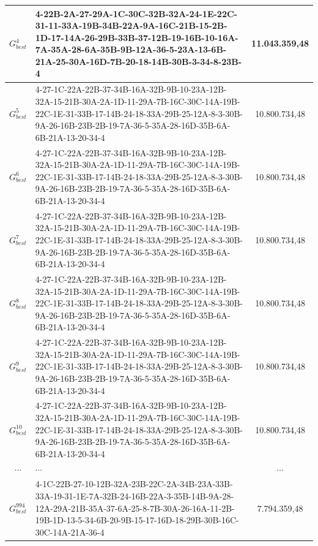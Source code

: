 {{{\begin{tabularx}{\textwidth}{|c|p{8cm}|c|}
    $G_{best}^{4}$    & 4-22B-2A-27-29A-1C-30C-32B-32A-24-1E-22C-31-11-33A-19B-34B-22A-9A-16C-21B-15-2B-1D-17-14A-26-29B-33B-37-12B-19-16B-10-16A-7A-35A-28-6A-35B-9B-12A-36-5-23A-13-6B-21A-25-30A-16D-7B-20-18-14B-30B-3-34-8-23B-4 & 11.043.359,48            \\ \hline
    $G_{best}^{5}$    & 4-27-1C-22A-22B-37-34B-16A-32B-9B-10-23A-12B-32A-15-21B-30A-2A-1D-11-29A-7B-16C-30C-14A-19B-22C-1E-31-33B-17-14B-24-18-33A-29B-25-12A-8-3-30B-9A-26-16B-23B-2B-19-7A-36-5-35A-28-16D-35B-6A-6B-21A-13-20-34-4 & 10.800.734,48            \\ \hline
    $G_{best}^{6}$    & 4-27-1C-22A-22B-37-34B-16A-32B-9B-10-23A-12B-32A-15-21B-30A-2A-1D-11-29A-7B-16C-30C-14A-19B-22C-1E-31-33B-17-14B-24-18-33A-29B-25-12A-8-3-30B-9A-26-16B-23B-2B-19-7A-36-5-35A-28-16D-35B-6A-6B-21A-13-20-34-4 & 10.800.734,48            \\ \hline
    $G_{best}^{7}$    & 4-27-1C-22A-22B-37-34B-16A-32B-9B-10-23A-12B-32A-15-21B-30A-2A-1D-11-29A-7B-16C-30C-14A-19B-22C-1E-31-33B-17-14B-24-18-33A-29B-25-12A-8-3-30B-9A-26-16B-23B-2B-19-7A-36-5-35A-28-16D-35B-6A-6B-21A-13-20-34-4 & 10.800.734,48            \\ \hline
    $G_{best}^{8}$    & 4-27-1C-22A-22B-37-34B-16A-32B-9B-10-23A-12B-32A-15-21B-30A-2A-1D-11-29A-7B-16C-30C-14A-19B-22C-1E-31-33B-17-14B-24-18-33A-29B-25-12A-8-3-30B-9A-26-16B-23B-2B-19-7A-36-5-35A-28-16D-35B-6A-6B-21A-13-20-34-4 & 10.800.734,48            \\ \hline
    $G_{best}^{9}$    & 4-27-1C-22A-22B-37-34B-16A-32B-9B-10-23A-12B-32A-15-21B-30A-2A-1D-11-29A-7B-16C-30C-14A-19B-22C-1E-31-33B-17-14B-24-18-33A-29B-25-12A-8-3-30B-9A-26-16B-23B-2B-19-7A-36-5-35A-28-16D-35B-6A-6B-21A-13-20-34-4 & 10.800.734,48            \\ \hline
    $G_{best}^{10}$   & 4-27-1C-22A-22B-37-34B-16A-32B-9B-10-23A-12B-32A-15-21B-30A-2A-1D-11-29A-7B-16C-30C-14A-19B-22C-1E-31-33B-17-14B-24-18-33A-29B-25-12A-8-3-30B-9A-26-16B-23B-2B-19-7A-36-5-35A-28-16D-35B-6A-6B-21A-13-20-34-4 & 10.800.734,48            \\ \hline
    $\cdots$          & $\cdots$                                                                                                                                                                                                      & $\cdots$                 \\ \hline
    $G_{best}^{994}$  & 4-1C-22B-27-10-12B-32A-23B-22C-2A-34B-23A-33B-33A-19-31-1E-7A-32B-24-16B-22A-3-35B-14B-9A-28-12A-29A-21B-35A-37-6A-25-8-7B-30A-26-16A-11-2B-19B-1D-13-5-34-6B-20-9B-15-17-16D-18-29B-30B-16C-30C-14A-21A-36-4 & 7.794.359,48             \\ \hline

\end{tabularx}}}}
